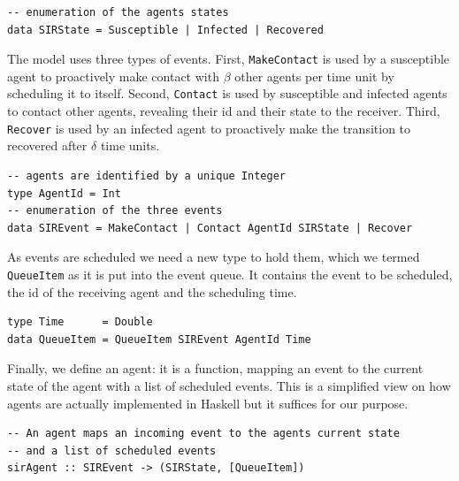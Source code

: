 \begin{footnotesize}
\begin{verbatim}
-- enumeration of the agents states
data SIRState = Susceptible | Infected | Recovered
\end{verbatim}
\end{footnotesize}

The model uses three types of events. First, \texttt{MakeContact} is used by a susceptible agent to proactively make contact with $\beta$ other agents per time unit by scheduling it to itself. Second, \texttt{Contact} is used by susceptible and infected agents to contact other agents, revealing their id and their state to the receiver. Third, \texttt{Recover} is used by an infected agent to proactively make the transition to recovered after $\delta$ time units.

\begin{footnotesize}
\begin{verbatim}
-- agents are identified by a unique Integer
type AgentId = Int
-- enumeration of the three events
data SIREvent = MakeContact | Contact AgentId SIRState | Recover 
\end{verbatim}
\end{footnotesize}

As events are scheduled we need a new type to hold them, which we termed \texttt{QueueItem} as it is put into the event queue. It contains the event to be scheduled, the id of the receiving agent and the scheduling time.

\begin{footnotesize}
\begin{verbatim}
type Time      = Double
data QueueItem = QueueItem SIREvent AgentId Time
\end{verbatim}
\end{footnotesize}

Finally, we define an agent: it is a function, mapping an event to the current state of the agent with a list of scheduled events. This is a simplified view on how agents are actually implemented in Haskell but it suffices for our purpose.

\begin{footnotesize}
\begin{verbatim}
-- An agent maps an incoming event to the agents current state 
-- and a list of scheduled events
sirAgent :: SIREvent -> (SIRState, [QueueItem])
\end{verbatim}
\end{footnotesize}

